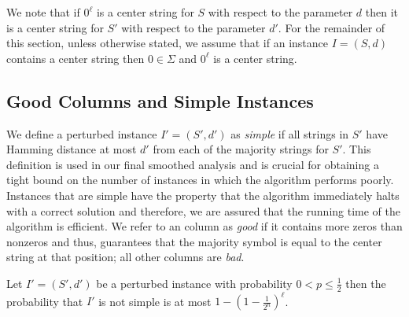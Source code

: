 \noindent We note that if $0^{\ell}$ is a center string for $S$ with respect to the parameter $d$ then it is a center string for $S'$ with respect to the parameter $d'$.  For the remainder of this section, unless otherwise stated, we assume that if an instance $I = (S, d)$ contains a center string then $0 \in \Sigma$ and $0^{\ell}$ is a center string.  

\subsection{Good Columns and Simple Instances}

We define a perturbed instance $I' = (S', d')$ as {\em simple} if all strings in $S'$ have Hamming distance at most $d'$ from each of the majority strings for $S'$.  This definition is used in our final smoothed analysis and is crucial for obtaining a tight bound on the number of instances in which the algorithm performs poorly. Instances that are simple have the property that the algorithm immediately halts with a correct solution and therefore, we are assured that the running time of the algorithm is efficient.  We refer to an column as {\em good} if it contains more zeros than nonzeros and thus, guarantees that the majority symbol is equal to the center string at that position; all other columns are {\em bad}.   

\begin{lemma} \label{lem:simple} Let $I' = (S', d')$ be a perturbed instance with probability $0 < p \leq \frac{1}{2}$ then the probability that $I'$ is not simple is at most $1 - \left( 1 - \frac{1}{2^n} \right)^{\ell}$.\end{lemma}

